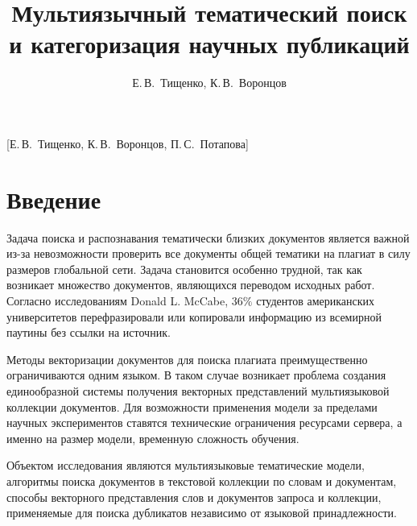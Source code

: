 \documentclass[12pt, twoside]{article}
\begin{document}
\title
    []
    {Мультиязычный тематический поиск и категоризация научных публикаций}

\author
    [Е.\,В.~Тищенко]
    {Е.\,В.~Тищенко, К.\,В.~Воронцов}
    [Е.\,В.~Тищенко, К.\,В.~Воронцов, П.\,С.~Потапова]




\maketitle
\linenumbers
\section{Введение}

Задача поиска и распознавания тематически близких документов является важной из-за невозможности проверить все документы общей тематики на плагиат в силу размеров глобальной сети. Задача становится особенно трудной, так как возникает множество документов, являющихся переводом исходных работ. Согласно исследованиям Donald L. McCabe,\cite{donaldSurvey}  $ 36\% $ студентов американских университетов перефразировали или копировали информацию из всемирной паутины без ссылки на источник. 

Методы векторизации документов для поиска плагиата  \cite{methodMLPlag, regression} преимущественно ограничиваются одним языком. В таком случае возникает проблема создания единообразной системы получения векторных представлений мультиязыковой коллекции документов. Для возможности применения модели за пределами научных экспериментов ставятся технические ограничения ресурсами сервера, а именно на размер модели, временную сложность обучения.

Объектом исследования являются мультиязыковые тематические модели, алгоритмы поиска документов в текстовой коллекции по словам и документам, способы векторного представления слов и документов запроса и коллекции, применяемые для поиска дубликатов независимо от языковой принадлежности.
\end{document}
